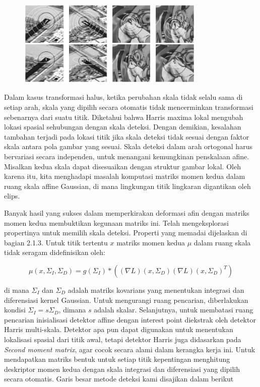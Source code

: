 \begin{figure}
  \centering{}
  \includegraphics[width=0.8\textwidth]{gambar/Non Adapted interest point.jpg}
  \caption{}
\end{figure}

Dalam kasus transformasi halus, ketika perubahan skala tidak selalu sama di setiap arah, skala yang dipilih secara otomatis tidak mencerminkan transformasi sebenarnya dari suatu titik. Diketahui bahwa Harris maxima lokal mengubah lokasi spasial sehubungan dengan skala deteksi. Dengan demikian, kesalahan tambahan terjadi pada lokasi titik jika skala deteksi tidak sesuai dengan faktor skala antara pola gambar yang sesuai. Skala deteksi dalam arah ortogonal harus bervariasi secara independen, untuk menangani kemungkinan penskalaan afine. Misalkan kedua skala dapat disesuaikan dengan struktur gambar lokal. Oleh karena itu, kita menghadapi masalah komputasi matriks momen kedua dalam ruang skala affine Gaussian, di mana lingkungan titik lingkaran digantikan oleh elips.

Banyak hasil yang sukses dalam memperkirakan deformasi afin dengan matriks momen kedua membuktikan kegunaan matriks ini. Telah mengeksplorasi propertinya untuk memilih skala deteksi. Properti yang memadai dijelaskan di bagian 2.1.3. Untuk titik tertentu \(x\) matriks momen kedua \(\mu \) dalam ruang skala tidak seragam didefinisikan oleh:

\begin{equation*}
  \mu(x,\Sigma_{I},\Sigma_{D}) = g(\Sigma_{I}) * ((\nabla L)(x,\Sigma_{D})(\nabla L)(x,\Sigma_{D})^{T})
\end{equation*}

di mana \(\Sigma_{I}\) dan \(\Sigma_{D}\) adalah matriks kovarians yang menentukan integrasi dan diferensiasi kernel Gaussian. Untuk mengurangi ruang pencarian, diberlakukan kondisi \(\Sigma_{I}=s\Sigma_{D}\), dimana \(s\) adalah skalar. Selanjutnya, untuk membatasi ruang pencarian inisialisasi detektor affine dengan interest point diekstrak oleh detektor Harris multi-skala. Detektor apa pun dapat digunakan untuk menentukan lokalisasi spasial dari titik awal, tetapi detektor Harris juga didasarkan pada \emph{Second moment matrix}, agar cocok secara alami dalam kerangka kerja ini. Untuk mendapatkan matriks bentuk untuk setiap titik kepentingan menghitung deskriptor momen kedua dengan skala integrasi dan diferensiasi yang dipilih secara otomatis. Garis besar metode deteksi kami disajikan dalam berikut

